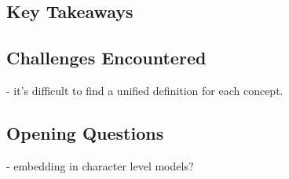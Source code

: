 \subsection{Key Takeaways}

\subsection{Challenges Encountered}
- it's difficult to find a unified definition for each concept.

\subsection{Opening Questions}
- embedding in character level models?